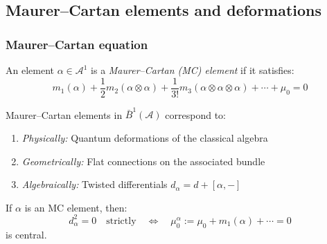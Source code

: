 \label{def:maurer-cartan}%
\label{eq:mc-equation}%
\label{thm:mc-deformations}%
\label{thm:mc-periods}%
\iffalse
\subsection{Maurer--Cartan elements and deformations}

\subsubsection{Maurer--Cartan equation}

\begin{definition}\label{def:maurer-cartan-DISABLED}
An element $\alpha \in \mathcal{A}^1$ is a \emph{Maurer--Cartan (MC) element} if it satisfies:
\begin{equation}\label{eq:mc-equation-DISABLED}
m_1(\alpha) + \frac{1}{2} m_2(\alpha \otimes \alpha) + \frac{1}{3!} m_3(\alpha \otimes \alpha
\otimes \alpha) + \cdots + \mu_0 = 0
\end{equation}
\end{definition}

\begin{theorem}\label{thm:mc-deformations-DISABLED}
Maurer--Cartan elements in $\bar{B}^1(\mathcal{A})$ correspond to:
\begin{enumerate}
\item \emph{Physically:} Quantum deformations of the classical algebra
\item \emph{Geometrically:} Flat connections on the associated bundle
\item \emph{Algebraically:} Twisted differentials $d_\alpha = d + [\alpha, -]$
\end{enumerate}

If $\alpha$ is an MC element, then:
\begin{equation}
d_\alpha^2 = 0 \quad \text{strictly} \quad \Longleftrightarrow \quad \mu_0^\alpha := \mu_0
+ m_1(\alpha) + \cdots = 0
\end{equation}
is central.
\end{theorem}

